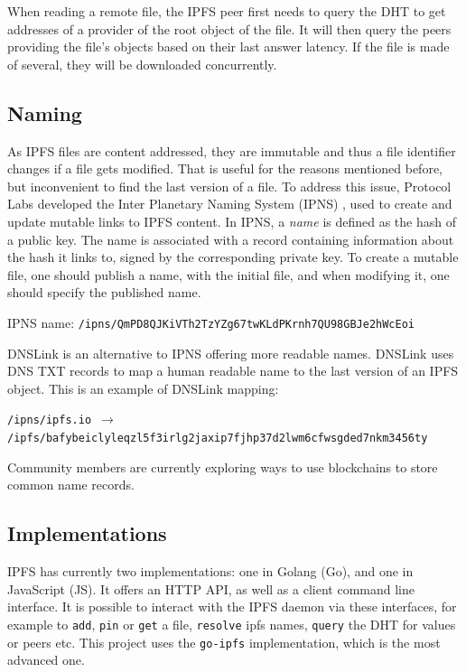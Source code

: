 \documentclass[a4paper,11pt,oneside]{report}
\begin{document}
When reading a remote file, the IPFS peer first needs to query the DHT to get addresses of a provider of the root object of the file. It will then query the peers providing the file's objects based on their last answer latency. If the file is made of several, they will be downloaded concurrently.

\subsection{Naming}

As IPFS files are content addressed, they are immutable and thus a file identifier changes if a file gets modified. That is useful for the reasons mentioned before, but inconvenient to find the last version of a file. To address this issue, Protocol Labs developed the Inter Planetary Naming System (IPNS) \cite{ipns}, used to create and update mutable links to IPFS content. In IPNS, a \textit{name} is defined as the hash of a public key. The name is associated with a record containing information about the hash it links to, signed by the corresponding private key. To create a mutable file, one should publish a name, with the initial file, and when modifying it, one should specify the published name.

IPNS name: \texttt{/ipns/QmPD8QJKiVTh2TzYZg67twKLdPKrnh7QU98GBJe2hWcEoi}

DNSLink \cite{dnslink} is an alternative to IPNS offering more readable names. DNSLink uses DNS TXT records to map a human readable name to the last version of an IPFS object. This is an example of DNSLink mapping:

\noindent\texttt{/ipns/ipfs.io $\rightarrow$ /ipfs/bafybeiclyleqzl5f3irlg2jaxip7fjhp37d2lwm6cfwsgded7nkm3456ty}

Community members are currently exploring ways to use blockchains to store common name records.

\subsection{Implementations}

IPFS has currently two implementations: one in Golang (Go), and one in JavaScript (JS). It offers an HTTP API, as well as a client command line interface. It is possible to interact with the IPFS daemon via these interfaces, for example to \texttt{add}, \texttt{pin} or \texttt{get} a file, \texttt{resolve} ipfs names, \texttt{query} the DHT for values or peers etc. This project uses the \texttt{go-ipfs} \cite{go-ipfs} implementation, which is the most advanced one.
\end{document}
